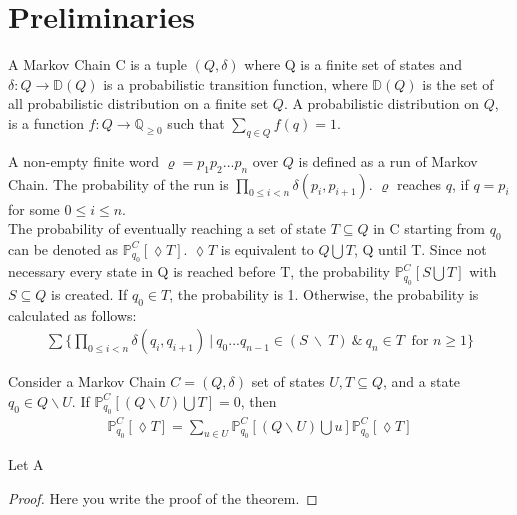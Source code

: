 \section{Preliminaries}
\label{sec:preliminaries}

\begin{definition}
\label{def:Markov Chains}
A Markov Chain C is a tuple $(Q,\delta)$ where Q is a finite set of states and $\delta: Q \rightarrow \mathbb{D}(Q)$ is a probabilistic transition function, where $\mathbb{D}(Q)$ is the set of all probabilistic distribution on a finite set $Q$. A probabilistic distribution on $Q$, is a function $f: Q\rightarrow\mathbb{Q}_{\geq0}$ such that $\sum_{q\in Q}f(q)=1$. 
\end{definition}

\noindent
A non-empty finite word $\varrho = p_1p_2...p_n$ over $Q$ is defined as a run of Markov Chain. The probability of the run is $\prod_{0\leq i < n}\delta(p_i,p_{i+1})$. $\varrho$ reaches $q$, if $q = p_i$ for some $0\leq i\leq n$. 
\newline\\
The probability of eventually reaching a set of state $T\subseteq Q$ in C starting from $q_0$ can be denoted as $\mathbb{P}_{q_0}^C[\lozenge T]$. $\lozenge T$ is equivalent to $Q\bigcup T$, Q until T. Since not necessary every state in Q is reached before T, the probability $\mathbb{P}_{q_0}^C[S\bigcup T]$ with $S\subseteq Q$ is created. If $q_0 \in T$, the probability is 1. Otherwise, the probability is calculated as follows: 
\begin{align*}
    \sum\{\prod_{0\leq i< n}\delta(q_i,q_{i+1}) ~|~ q_0...q_{n-1}\in (S~\backslash~ T) ~\&~ q_n \in T\ \text{ for } n\geq 1\}
\end{align*}
\begin{lemma}
\label{lemma 1}
Consider a Markov Chain $C=(Q,\delta)$ set of states $U,T\subseteq Q$, and a state $q_0\in Q\backslash U$. If $\mathbb{P}_{q_0}^C[(Q\backslash U)\bigcup T]=0$, then
\begin{align*}
    \mathbb{P}_{q_0}^C[\lozenge T] = \sum_{u\in U}\mathbb{P}_{q_0}^C[(Q\backslash U) \bigcup u]\mathbb{P}_{q_0}^C[\lozenge T]
\end{align*}
\end{lemma}
\begin{definition}
    
\end{definition}
\begin{theorem}[]
\label{the:nameOfTheorem}
Let A
\begin{proof}
	Here you write the proof of the theorem.
\end{proof}
\end{theorem}


